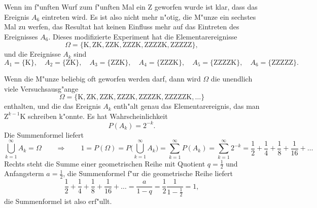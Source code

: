 \begin{loesung}
\begin{teilaufgaben}
Wenn im f"unften Wurf zum f"unften Mal ein Z geworfen wurde ist klar,
dass das Ereignis $A_6$ eintreten wird.
Es ist also nicht mehr n"otig, die M"unze ein sechstes Mal zu werfen, 
das Resultat hat keinen Einfluss mehr auf das Eintreten des Ereignisses
$A_6$.
Dieses modifizierte Experiment hat die Elementarereignisse
\[
\Omega = \{
\text{K},
\text{ZK},
\text{ZZK},
\text{ZZZK},
\text{ZZZZK},
\text{ZZZZZ}
\},
\]
und die Ereignisse $A_k$ sind
\[
A_1=\{\text{K}\},\quad
A_2=\{\text{ZK}\},\quad
A_3=\{\text{ZZK}\},\quad
A_4=\{\text{ZZZK}\},\quad
A_5=\{\text{ZZZZK}\},\quad
A_6=\{\text{ZZZZZ}\}.
\]
\item
Wenn die M"unze beliebig oft geworfen werden darf, dann wird $\Omega$ die unendlich
viele Versuchsausg"ange
\[
\Omega = \{
\text{K},
\text{ZK},
\text{ZZK},
\text{ZZZK},
\text{ZZZZK},
\text{ZZZZZK},
\dots
\}
\]
enthalten, und die das Ereignis $A_k$ enth"alt genau das Elementarereignis,
das man $\text{Z}^{k-1}\text{K}$ schreiben k"onnte.
Es hat Wahrscheinlichkeit
\[
P(A_k)=2^{-k}.
\]
Die Summenformel liefert
\[
\bigcup_{k=1}^\infty A_k=\Omega
\qquad\Rightarrow\qquad
1=P(\Omega)=P\biggl(
\bigcup_{k=1}^\infty A_k
\biggr)
=\sum_{k=1}^\infty P(A_k)=\sum_{k=1}^\infty 2^{-k}=
\frac12+\frac14+\frac18+\frac1{16}+\dots
\]
Rechts steht die Summe einer geometrischen Reihe mit Quotient $q=\frac12$ und
Anfangsterm $a=\frac12$, die Summenformel f"ur die geometrische Reihe liefert
\[
\frac12+\frac14+\frac18+\frac1{16}+\dots=\frac{a}{1-q}=\frac12\frac1{1-\frac12}=1,
\]
die Summenformel ist also erf"ullt.
\end{teilaufgaben}
\end{loesung}

